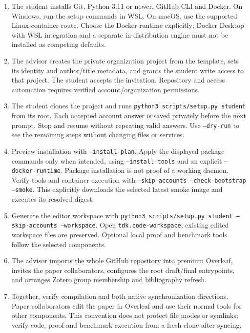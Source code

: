 \begin{enumerate}
  \item The student installs Git, Python 3.11 or newer, GitHub CLI and Docker. On Windows, run
    the setup commands in WSL. On macOS, use the supported Linux-container route.
    Choose the Docker runtime explicitly; Docker Desktop with WSL integration and
    a separate in-distribution engine must not be installed as competing defaults.
  \item The advisor creates the private organization project from the template,
    sets its identity and author/title metadata, and grants the student write
    access to that project. The student accepts the invitation. Repository and
    access automation requires verified account/organization permissions.
  \item The student clones the project and runs
    \texttt{python3 scripts/setup.py student} from its root. Each accepted account
    answer is saved privately before the next prompt. Stop and resume without
    repeating valid answers. Use \texttt{--dry-run} to see the remaining steps
    without changing files or services.
  \item Preview installation with \texttt{--install-plan}. Apply the displayed
    package commands only when intended, using \texttt{--install-tools} and an
    explicit \texttt{--docker-runtime}. Package installation is not proof of a
    working daemon. Verify tools and container execution with
    \texttt{--skip-accounts --check-bootstrap --smoke}. This explicitly downloads
    the selected latest smoke image and executes its resolved digest.
  \item Generate the editor workspace with
    \texttt{python3 scripts/setup.py student --skip-accounts --workspace}.
    Open \texttt{tdk.code-workspace}; existing edited workspace files are preserved.
    Optional local proof and benchmark tools follow the selected components.
  \item The advisor imports the whole GitHub repository into premium Overleaf,
    invites the paper collaborators, configures the root draft/final entrypoints,
    and arranges Zotero group membership and bibliography refresh.
  \item Together, verify compilation and both native synchronization directions.
    Paper collaborators edit the paper in Overleaf and use their normal tools for
    other components. This convention does not protect file modes or symlinks;
    verify code, proof and benchmark execution from a fresh clone after syncing.
\end{enumerate}

